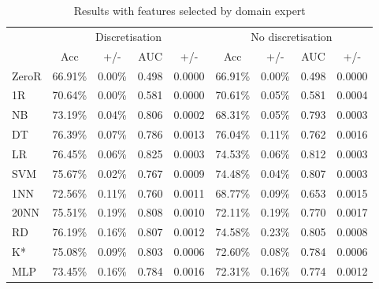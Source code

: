 \begin{table}[htbp]
\caption{Results with features selected by domain expert}
\begin{tabular}{|l|cccc|cccc|}
\hline
 & \multicolumn{ 4}{c|}{Discretisation} & \multicolumn{ 4}{c|}{No discretisation} \\ 
  & Acc & +/- & AUC & +/- & Acc & +/- & AUC & +/- \\ \hline
  ZeroR & 66.91\% & 0.00\% & 0.498 & 0.0000 & 66.91\% & 0.00\% & 0.498 & 0.0000 \\ 
  1R & 70.64\% & 0.00\% & 0.581 & 0.0000 & 70.61\% & 0.05\% & 0.581 & 0.0004 \\ 
  NB & 73.19\% & 0.04\% & 0.806 & 0.0002 & 68.31\% & 0.05\% & 0.793 & 0.0003 \\ 
  DT & 76.39\% & 0.07\% & 0.786 & 0.0013 & 76.04\% & 0.11\% & 0.762 & 0.0016 \\ 
  LR & 76.45\% & 0.06\% & 0.825 & 0.0003 & 74.53\% & 0.06\% & 0.812 & 0.0003 \\ 
  SVM & 75.67\% & 0.02\% & 0.767 & 0.0009 & 74.48\% & 0.04\% & 0.807 & 0.0003 \\ 
  1NN & 72.56\% & 0.11\% & 0.760 & 0.0011 & 68.77\% & 0.09\% & 0.653 & 0.0015 \\ 
  20NN & 75.51\% & 0.19\% & 0.808 & 0.0010 & 72.11\% & 0.19\% & 0.770 & 0.0017 \\ 
  RD & 76.19\% & 0.16\% & 0.807 & 0.0012 & 74.58\% & 0.23\% & 0.805 & 0.0008 \\ 
  K* & 75.08\% & 0.09\% & 0.803 & 0.0006 & 72.60\% & 0.08\% & 0.784 & 0.0006 \\ 
  MLP & 73.45\% & 0.16\% & 0.784 & 0.0016 & 72.31\% & 0.16\% & 0.774 & 0.0012 \\ \hline
  \end{tabular}
\end{table}

